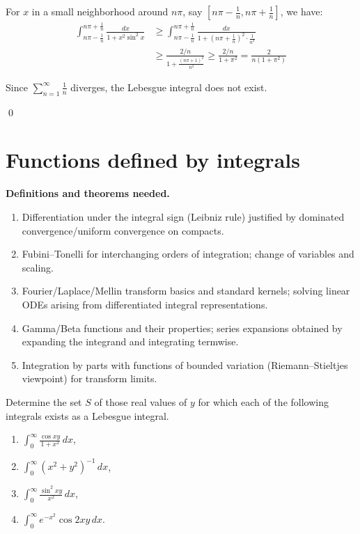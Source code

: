 \begin{enumerate}[label=(\alph*)]
For $x$ in a small neighborhood around $n\pi$, say $[n\pi - \frac{1}{n}, n\pi + \frac{1}{n}]$, we have:
\begin{align*}
\int_{n\pi - \frac{1}{n}}^{n\pi + \frac{1}{n}} \frac{dx}{1 + x^2 \sin^2 x} &\geq \int_{n\pi - \frac{1}{n}}^{n\pi + \frac{1}{n}} \frac{dx}{1 + (n\pi + \frac{1}{n})^2 \cdot \frac{1}{n^2}} \\
&\geq \frac{2/n}{1 + \frac{(n\pi + 1)^2}{n^2}} \geq \frac{2/n}{1 + \pi^2} = \frac{2}{n(1 + \pi^2)}
\end{align*}

Since $\sum_{n=1}^{\infty} \frac{1}{n}$ diverges, the Lebesgue integral does not exist.
\end{enumerate}\qed
\section{Functions defined by integrals}

\noindent\textbf{Definitions and theorems needed.}
\begin{enumerate}[label=(\alph*)]
\item Differentiation under the integral sign (Leibniz rule) justified by dominated convergence/uniform convergence on compacts.
\item Fubini–Tonelli for interchanging orders of integration; change of variables and scaling.
\item Fourier/Laplace/Mellin transform basics and standard kernels; solving linear ODEs arising from differentiated integral representations.
\item Gamma/Beta functions and their properties; series expansions obtained by expanding the integrand and integrating termwise.
\item Integration by parts with functions of bounded variation (Riemann–Stieltjes viewpoint) for transform limits.
\end{enumerate}



\begin{problembox}
Determine the set $S$ of those real values of $y$ for which each of the following integrals exists as a Lebesgue integral.
\begin{enumerate}[label=(\alph*)]
\item $\int_{0}^{\infty} \frac{\cos xy}{1 + x^2} \, dx$,
\item $\int_{0}^{\infty} (x^2 + y^2)^{-1} \, dx$,
\item $\int_{0}^{\infty} \frac{\sin^2 xy}{x^2} \, dx$,
\item $\int_{0}^{\infty} e^{-x^2} \cos 2xy \, dx.$
\end{enumerate}
\end{problembox}

